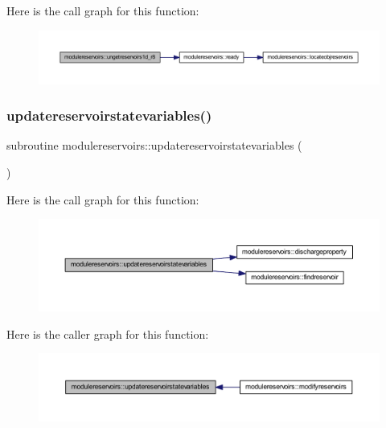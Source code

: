 Here is the call graph for this function\+:\nopagebreak
\begin{figure}[H]
\begin{center}
\leavevmode
\includegraphics[width=350pt]{namespacemodulereservoirs_abf51c8915a730bb078066132f1085b94_cgraph}
\end{center}
\end{figure}
\mbox{\label{namespacemodulereservoirs_a2c3bef9b0aaebe8a9cfd93bc27290e82}} 
\subsubsection{\texorpdfstring{updatereservoirstatevariables()}{updatereservoirstatevariables()}}
{\footnotesize\ttfamily subroutine modulereservoirs\+::updatereservoirstatevariables (\begin{DoxyParamCaption}{ }\end{DoxyParamCaption})\hspace{0.3cm}{\ttfamily [private]}}

Here is the call graph for this function\+:\nopagebreak
\begin{figure}[H]
\begin{center}
\leavevmode
\includegraphics[width=350pt]{namespacemodulereservoirs_a2c3bef9b0aaebe8a9cfd93bc27290e82_cgraph}
\end{center}
\end{figure}
Here is the caller graph for this function\+:\nopagebreak
\begin{figure}[H]
\begin{center}
\leavevmode
\includegraphics[width=350pt]{namespacemodulereservoirs_a2c3bef9b0aaebe8a9cfd93bc27290e82_icgraph}
\end{center}
\end{figure}
\mbox{\label{namespacemodulereservoirs_a2af994aa3f7d8318c768f2960bb34e06}} 
